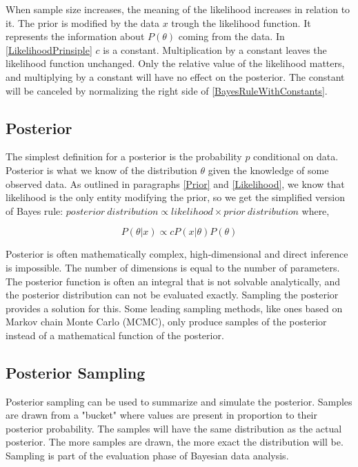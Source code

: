 When sample size increases, the meaning of the likelihood increases in relation to it. \cite{Mcelreath2015StatisticalRA} The prior is modified by the data $x$ trough the likelihood function. It represents the information about $P(\theta)$ coming from the data. In \ref{LikelihoodPrinsiple} $c$ is a constant. Multiplication by a constant leaves the likelihood function unchanged. Only the relative value of the likelihood matters, and multiplying by a constant will have no effect on the posterior. The constant will be canceled by normalizing the right side of \ref{BayesRuleWithConstants}.\cite{Box1973BayesianII}
 
\subsection{Posterior}\label{Posterior}
The simplest definition for a posterior is the probability $p$ conditional on data.\cite{Mcelreath2015StatisticalRA} Posterior is what we know of the distribution $\theta$ given the knowledge of some observed data. As outlined in paragraphs \ref{Prior} and \ref{Likelihood}, we know that likelihood is the only entity modifying the prior, so we get the simplified version of Bayes rule: $posterior\ distribution \propto likelihood \times prior\ distribution$ where,

\begin{equation}\label{BayesRuleWithConstants}
P(\theta|x) \propto cP(x|\theta)P(\theta)
\end{equation}\cite{Box1973BayesianII}

Posterior is often mathematically complex, high-dimensional and direct inference is impossible. The number of dimensions is equal to the number of parameters. The posterior function is often an integral that is not solvable analytically, and the posterior distribution can not be evaluated exactly. Sampling the posterior provides a solution for this.\cite{vandeSchoot2020BayesianSA} Some leading sampling methods, like ones based on Markov chain Monte Carlo (MCMC), only produce samples of the posterior instead of a mathematical function of the posterior.\cite{Mcelreath2015StatisticalRA}

\subsection{Posterior Sampling}\label{PosteriorSampling}

Posterior sampling can be used to summarize and simulate the posterior. Samples are drawn from a "bucket" where values are present in proportion to their posterior probability. The samples will have the same distribution as the actual posterior. The more samples are drawn, the more exact the distribution will be. Sampling is part of the evaluation phase of Bayesian data analysis.
\cite{Mcelreath2015StatisticalRA}

